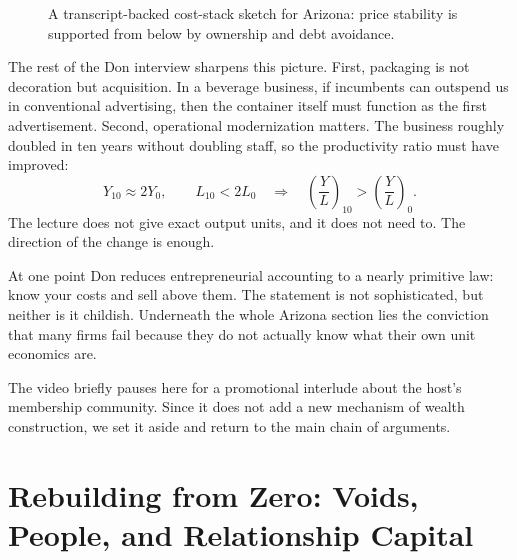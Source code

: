 \begin{figure}
\centering
{}
\caption{A transcript-backed cost-stack sketch for Arizona: price stability is supported from below by ownership and debt avoidance.}
\end{figure}

The rest of the Don interview sharpens this picture. First, packaging is not decoration but acquisition. In a beverage business, if incumbents can outspend us in conventional advertising, then the container itself must function as the first advertisement. Second, operational modernization matters. The business roughly doubled in ten years without doubling staff, so the productivity ratio must have improved:
\begin{equation}
Y_{10}\approx 2Y_0,\qquad L_{10}<2L_0
\quad\Longrightarrow\quad
\left(\frac{Y}{L}\right)_{10}>\left(\frac{Y}{L}\right)_0.
\end{equation}
The lecture does not give exact output units, and it does not need to. The direction of the change is enough.

At one point Don reduces entrepreneurial accounting to a nearly primitive law: know your costs and sell above them. The statement is not sophisticated, but neither is it childish. Underneath the whole Arizona section lies the conviction that many firms fail because they do not actually know what their own unit economics are.

\begin{remark}
The video briefly pauses here for a promotional interlude about the host's membership community. Since it does not add a new mechanism of wealth construction, we set it aside and return to the main chain of arguments.
\end{remark}

\section{Rebuilding from Zero: Voids, People, and Relationship Capital}

